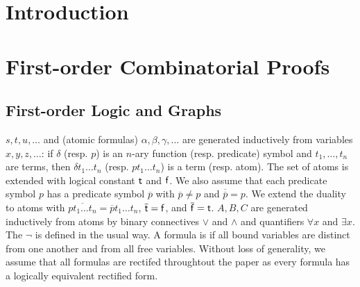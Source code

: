 \documentclass[conference,twosided,10pt]{IEEEtran}
\theoremstyle{definition}
\begin{document}
\maketitle

\begin{abstract}
\end{abstract}





%
\IEEEpeerreviewmaketitle

\linenumbers
\section{Introduction}

\section{First-order Combinatorial Proofs}
\subsection{First-order Logic and Graphs}

 $s, t, u, \ldots$ and  (atomic formulas) $\alpha, \beta,
\gamma, \ldots$ are generated inductively from variables $x, y, z, \ldots$: if
$\delta$ (resp. $p$) is an $n$-ary function (resp. predicate) symbol and $t_1, \ldots,
t_n$ are terms, then $\delta t_1 \ldots t_n$ (resp. $pt_1 \ldots t_n$) is a term
(resp. atom). The set of atoms is extended with logical constant ${\mathsf t}$ and
${\mathsf f}$. We also assume that each predicate symbol $p$ has a 
predicate symbol $\overline{p}$ with $\overline{p} \neq p$ and
$\overline{\overline{p}} = p$. We extend the duality to atoms with
$\overline{pt_1 \ldots t_n} = \overline{p}t_1 \ldots t_n$, $\overline{{\mathsf t}} =
{\mathsf f}$, and $\overline{{\mathsf f}} = {\mathsf t}$.  $A, B, C$ are generated inductively from atoms by binary
connectives $\vee$ and $\wedge$ and quantifiers $\forall x$ and $\exists x$.
The  $\neg$ is defined in the usual way. A formula is  if all bound variables are distinct from one another and from all free variables. Without loss of generality, we assume that all formulas are rectifed throughtout the paper as every formula has a logically equivalent rectified form.
\end{document}
